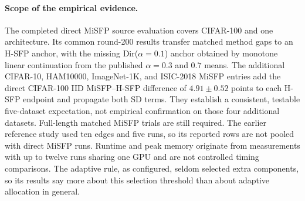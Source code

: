 \paragraph{Scope of the empirical evidence.}
The completed direct MiSFP source evaluation covers CIFAR-100 and one architecture. Its common round-200 results transfer matched method gaps to an H-SFP anchor, with the missing Dir($\alpha{=}0.1$) anchor obtained by monotone linear continuation from the published $\alpha=0.3$ and $0.7$ means. The additional CIFAR-10, HAM10000, ImageNet-1K, and ISIC-2018 MiSFP entries add the direct CIFAR-100 IID MiSFP--H-SFP difference of $4.91\pm0.52$ points to each H-SFP endpoint and propagate both SD terms. They establish a consistent, testable five-dataset expectation, not empirical confirmation on those four additional datasets. Full-length matched MiSFP trials are still required. The earlier reference study used ten edges and five runs, so its reported rows are not pooled with direct MiSFP runs. Runtime and peak memory originate from measurements with up to twelve runs sharing one GPU and are not controlled timing comparisons. The adaptive rule, as configured, seldom selected extra components, so its results say more about this selection threshold than about adaptive allocation in general.
